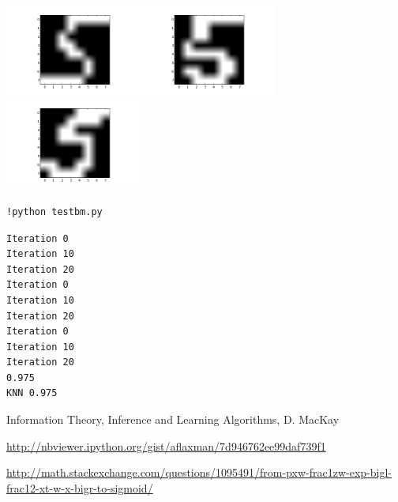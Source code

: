 \documentclass[12pt,fleqn]{article}\usepackage{../common}
\begin{document}
\includegraphics[height=3cm]{boltzmann_01.png}\includegraphics[height=3cm]{boltzmann_02.png}\includegraphics[height=3cm]{boltzmann_03.png}




\begin{verbatim}
!python testbm.py
\end{verbatim}

\begin{verbatim}
Iteration 0
Iteration 10
Iteration 20
Iteration 0
Iteration 10
Iteration 20
Iteration 0
Iteration 10
Iteration 20
0.975
KNN 0.975
\end{verbatim}




Information Theory, Inference and Learning Algorithms, D. MacKay

\url{http://nbviewer.ipython.org/gist/aflaxman/7d946762ee99daf739f1}

\url{http://math.stackexchange.com/questions/1095491/from-pxw-frac1zw-exp-bigl-frac12-xt-w-x-bigr-to-sigmoid/}
\end{document}
